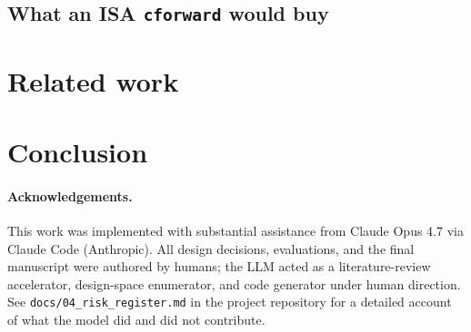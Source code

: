 \documentclass[acmsmall,nonacm]{acmart}
\begin{document}

\subsection{What an ISA \texttt{cforward} would buy}


\section{Related work}
\label{sec:related}


\section{Conclusion}
\label{sec:conc}


\paragraph{Acknowledgements.}
This work was implemented with substantial assistance from Claude Opus
4.7 via Claude Code (Anthropic). All design decisions, evaluations,
and the final manuscript were authored by humans; the LLM acted as a
literature-review accelerator, design-space enumerator, and code
generator under human direction. See \texttt{docs/04\_risk\_register.md}
in the project repository for a detailed account of what the model
did and did not contribute.



\end{document}
